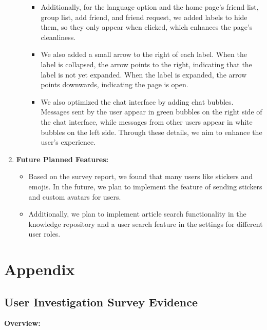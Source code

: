 \documentclass[12pt]{article}
\begin{document}
\begin{enumerate}
\begin{itemize}
\begin{itemize}
                \item Additionally, for the language option and the home page's friend list, group list, add friend, and friend request, we added labels to hide them, so they only appear when clicked, which enhances the page's cleanliness.
                \item We also added a small arrow to the right of each label. When the label is collapsed, the arrow points to the right, indicating that the label is not yet expanded. When the label is expanded, the arrow points downwards, indicating the page is open.
                \item We also optimized the chat interface by adding chat bubbles. Messages sent by the user appear in green bubbles on the right side of the chat interface, while messages from other users appear in white bubbles on the left side. Through these details, we aim to enhance the user's experience.
            \end{itemize}
        \end{itemize}

    \item \textbf{Future Planned Features:}
        \begin{itemize}
            \item Based on the survey report, we found that many users like stickers and emojis. In the future, we plan to implement the feature of sending stickers and custom avatars for users.
            \item Additionally, we plan to implement article search functionality in the knowledge repository and a user search feature in the settings for different user roles.
        \end{itemize}
\end{enumerate}

\section{Appendix}

\subsection{User Investigation Survey Evidence}
\label{survey}
\textbf{Overview:}
\end{document}
